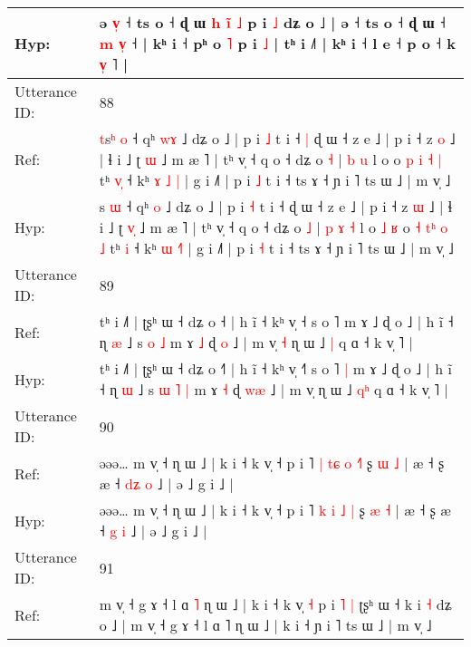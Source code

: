 \documentclass[10pt]{article}
\DeclareRobustCommand{\hl}[1]{{\textcolor{red}{#1}}}
\begin{document}
\begin{longtable}{ll}
Hyp: & ə\hl{ }\hl{v}\hl{̩} ˧ ts o ˧ ɖ ɯ\hl{ }\hl{h} \hl{i}\hl{̃} \hl{˩} p i \hl{˩} dʑ o ˩ | ə ˧ ts o ˧ ɖ ɯ ˧ \hl{m} \hl{}\hl{v}\hl{̩} ˧ | kʰ i ˧ pʰ o\hl{}\hl{} \hl{˥} p i \hl{˩} | tʰ i ˩˥ | kʰ i ˧\hl{}\hl{} l e ˧ p\hl{} o ˧ k\hl{}\hl{}\hl{}\hl{}\hl{}\hl{}\hl{}\hl{}\hl{}\hl{}\hl{}\hl{}\hl{}\hl{}\hl{}\hl{}\hl{}\hl{}\hl{}\hl{} \hl{}\hl{}\hl{v}\hl{̩} \hl{}˥ |
 \\
\midrule
Utterance ID: & 88 \\
Ref: & \hl{t}s\hl{ʰ} \hl{o} ˧ qʰ \hl{w}\hl{ɤ} ˩ dʑ o ˩ | p i \hl{˩} t i ˧\hl{ }\hl{|} ɖ ɯ ˧ z e ˩ | p i ˧ z \hl{o} ˩ | ɬ i ˩ ʈ \hl{}\hl{ɯ} ˩ m æ ˥ | tʰ v̩ ˧ q o ˧ dʑ o \hl{˧} |\hl{}\hl{} \hl{b} \hl{u} l o\hl{}\hl{}\hl{}\hl{} o \hl{p} \hl{}\hl{i} \hl{˧} \hl{|} tʰ \hl{v}\hl{̩} ˧ kʰ \hl{ɤ} \hl{˩}\hl{ }\hl{|} | g i ˩˥ | p i \hl{˩} t i ˧ ts ɤ ˧ ɲ i ˥ ts ɯ ˩ | m v̩ ˩
 \\
Hyp: & \hl{}s\hl{} \hl{ɯ} ˧ qʰ \hl{}\hl{o} ˩ dʑ o ˩ | p i \hl{˧} t i ˧\hl{}\hl{} ɖ ɯ ˧ z e ˩ | p i ˧ z \hl{ɯ} ˩ | ɬ i ˩ ʈ \hl{v}\hl{̩} ˩ m æ ˥ | tʰ v̩ ˧ q o ˧ dʑ o \hl{˩} |\hl{ }\hl{p} \hl{ɤ} \hl{˧} l o\hl{ }\hl{˩}\hl{ }\hl{ʁ} o \hl{˧} \hl{t}\hl{ʰ} \hl{o} \hl{˩} tʰ \hl{}\hl{i} ˧ kʰ \hl{ɯ} \hl{}\hl{˧}\hl{˥} | g i ˩˥ | p i \hl{˧} t i ˧ ts ɤ ˧ ɲ i ˥ ts ɯ ˩ | m v̩ ˩
 \\
\midrule
Utterance ID: & 89 \\
Ref: & tʰ i ˩˥ | ʈʂʰ ɯ ˧ dʑ o ˧\hl{} | h ĩ ˧ kʰ v̩ ˧\hl{} s o ˥\hl{}\hl{} m ɤ ˩ ɖ o ˩ | h ĩ ˧ ɳ \hl{æ} ˩ s\hl{}\hl{} \hl{o} \hl{˩} m ɤ \hl{˩} ɖ \hl{}\hl{o} ˩ | m v̩\hl{ }\hl{˧} ɳ ɯ ˩ \hl{}\hl{|} q ɑ ˧ k v̩ ˥ |
 \\
Hyp: & tʰ i ˩˥ | ʈʂʰ ɯ ˧ dʑ o ˧\hl{˥} | h ĩ ˧ kʰ v̩ ˧\hl{˥} s o ˥\hl{ }\hl{|} m ɤ ˩ ɖ o ˩ | h ĩ ˧ ɳ \hl{ɯ} ˩ s\hl{ }\hl{ɯ} \hl{˥} \hl{|} m ɤ \hl{˧} ɖ \hl{w}\hl{æ} ˩ | m v̩\hl{}\hl{} ɳ ɯ ˩ \hl{q}\hl{ʰ} q ɑ ˧ k v̩ ˥ |
 \\
\midrule
Utterance ID: & 90 \\
Ref: & əəə… m v̩ ˧ ɳ ɯ ˩ | k i ˧ k v̩ ˧ p i ˥ \hl{|} \hl{t}\hl{ɕ} \hl{o} \hl{˧}\hl{˥} ʂ \hl{ɯ} \hl{˩} | æ ˧ ʂ æ ˧ \hl{d}\hl{ʑ} \hl{o} ˩ | ə ˩ g i ˩ |
 \\
Hyp: & əəə… m v̩ ˧ ɳ ɯ ˩ | k i ˧ k v̩ ˧ p i ˥ \hl{k} \hl{}\hl{i} \hl{˩} \hl{}\hl{|} ʂ \hl{æ} \hl{˧} | æ ˧ ʂ æ ˧ \hl{}\hl{g} \hl{i} ˩ | ə ˩ g i ˩ |
 \\
\midrule
Utterance ID: & 91 \\
Ref: & m v̩ ˧ g ɤ ˧ l ɑ \hl{˥} ɳ ɯ ˩ | k i ˧ k v̩ \hl{˧} p i\hl{ }\hl{˥} \hl{|} ʈʂʰ ɯ ˧ k i \hl{˧} dʑ o ˩ | m v̩ ˧ g ɤ ˧ l ɑ ˥ ɳ ɯ ˩ | k i ˧ ɲ i ˥ ts ɯ ˩ | m v̩ ˩
 \\

\end{longtable}
\end{document}
